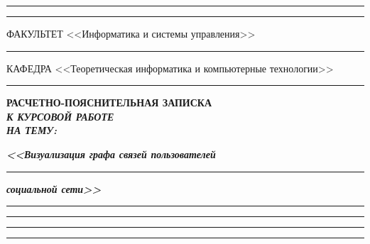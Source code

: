 \documentclass[14pt, russian]{scrartcl}
\begin{document}
\begin{titlepage}
	\vspace{-2pt}
	\hspace{-34.5pt}\rule{\textwidth}{2.5pt}

	\vspace*{-20.3pt}
	\hspace{-34.5pt}\rule{\textwidth}{0.4pt}

	\vspace{0.5ex}
	\noindent \small ФАКУЛЬТЕТ\hspace{80pt} <<Информатика и системы управления>>

	\vspace*{-16pt}
	\hspace{35pt}\rule{0.855\textwidth}{0.4pt}

	\vspace{0.5ex}
	\noindent \small КАФЕДРА\hspace{50pt} <<Теоретическая информатика и компьютерные технологии>>

	\vspace*{-16pt}
	\hspace{25pt}\rule{0.875\textwidth}{0.4pt}


	\vspace{3em}

	\begin{center}
		\Large \bf{РАСЧЕТНО-ПОЯСНИТЕЛЬНАЯ ЗАПИСКА\\\textbf{\textit{К КУРСОВОЙ РАБОТЕ\\НА ТЕМУ:}} \\}
	\end{center}

	\vspace*{-6ex}
	\begin{center}
		\Large{\textit{\textbf{<<Визуализация графа связей пользователей }}}

		\vspace*{-3ex}
		\rule{0.9\textwidth}{1.2pt}

		\vspace*{-0.2ex}
		\Large{\textit{\textbf{социальной сети>>}}}
		\vspace*{-3ex}
		\vspace*{-0.2ex}
		\rule{0.9\textwidth}{1.2pt}

		\vspace*{-0.2ex}
		\rule{0.9\textwidth}{1.2pt}

		\vspace*{-0.2ex}
		\rule{0.9\textwidth}{1.2pt}

		\vspace*{-0.2ex}
		\rule{0.9\textwidth}{1.2pt}
	\end{center}


\end{titlepage}
\end{document}
